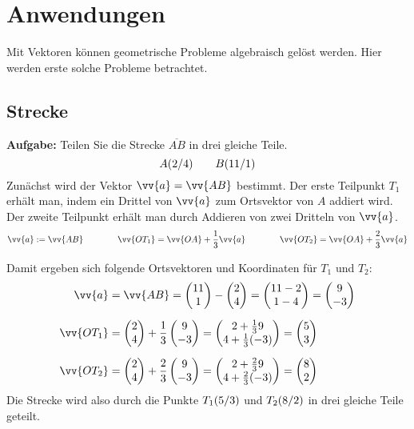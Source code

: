 \newpage
\section{Anwendungen}

Mit Vektoren können geometrische Probleme algebraisch gelöst werden. Hier werden erste solche Probleme betrachtet.

\subsection{Strecke}
\textbf{Aufgabe:} Teilen Sie die Strecke $\overline{AB}$ in drei gleiche Teile.
\[
  \pxy[A]{2,4} \qquad \pxy[B]{11,1}
\]
Zunächst wird der Vektor $\vv{a} = \vv{AB}$ bestimmt. Der erste Teilpunkt $T_{1}$ erhält man, indem ein Drittel von $\vv{a}$ zum Ortsvektor von $A$ addiert wird. Der zweite Teilpunkt erhält man durch Addieren von zwei Dritteln von $\vv{a}$.
\[
  \vv{a} := \vv{AB} \qquad\qquad \vv{OT_{1}} = \vv{OA} + \frac{1}{3}\vv{a} \qquad\qquad \vv{OT_{2}} = \vv{OA} + \frac{2}{3}\vv{a}
\]

\begin{center}
\end{center}
Damit ergeben sich folgende Ortsvektoren und Koordinaten für $T_{1}$ und $T_{2}$:
\begin{align*}
       \vv{a} &= \vv{AB} = \vxy{11,1} - \vxy{2,4} = \vxy{11-2,1-4} = \vxy{9,-3} \\[2mm]
  \vv{OT_{1}} &= \vxy{2,4}+\frac{1}{3}\vxy{9,-3} = \vxy{2+\frac{1}{3}9,4+\frac{1}{3}(-3)} = \vxy{5,3} \\[2mm]
  \vv{OT_{2}} &= \vxy{2,4}+\frac{2}{3}\vxy{9,-3} = \vxy{2+\frac{2}{3}9,4+\frac{2}{3}(-3)} = \vxy{8,2}
\end{align*}
Die Strecke wird also durch die Punkte $\pxy[T_{1}]{5,3}$ und $\pxy[T_{2}]{8,2}$ in drei gleiche Teile geteilt.

